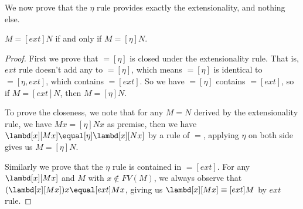 \documentclass[../../../include/open-logic-section]{subfiles}
\begin{document}
We now prove that the $\eta$ rule provides exactly the extensionality,
and nothing else.
\begin{thm}
  $M \equal[ext] N$ if and only if $M \equal[\eta] N$.
\end{thm}
\begin{proof}
  First we prove that $\equal[\eta]$ is closed under the 
  extensionality rule. That is, $ext$ rule doesn't add any 
  to $\equal[\eta]$, which means $\equal[\eta]$ is identical
  to $\equal[\eta,ext]$, which contains
  $\equal[ext]$. So we have $\equal[\eta]$ contains
  $\equal[ext]$, so if $M \equal[ext] N$, then $M
  \equal[\eta] N$.

  To prove the closeness, we note that for any $M \equal
  N$ derived by the extensionality rule, we have $Mx \equal[\eta]
  Nx$ as premise, then we have $\lambd[x][Mx] \equal[\eta]
  \lambd[x][Nx]$ by a rule of $\equal$, applying $\eta$ on both side gives us $M
  \equal[\eta] N$.


  Similarly we prove that the $\eta$ rule is contained in
  $\equal[ext]$. For any $\lambd[x][Mx]$ and $M$ with $x \notin FV(M)$, we always
  observe that $(\lambd[x][Mx])x \equal[ext] Mx$, giving us
  $\lambd[x][Mx] \equiv[ext] M$ by $ext$ rule.
\end{proof}
\end{document}
